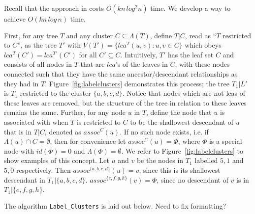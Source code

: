 \documentclass{article}
\newcommand{\leafset}{\Lambda}
\begin{document}
    Recall that the approach in \cite{gawrychowski2017faster} costs $O(kn\,log^2n)$ time. We develop a way to achieve $O(kn\,log\,n)$ time.

    First, for any tree $T$ and any cluster $C \subseteq \leafset(T)$, define $T|C$, read as ``$T$ restricted to $C$'', as the tree $T'$ with $V(T') = \{lca^T(u, v) : u, v \in C\}$ which obeys $lca^T(C') = lca^{T'}(C')$ for all $C' \subseteq C$. Intuitively, $T'$ has the leaf set $C$ and consists of all nodes in $T$ that are $lca$'s of the leaves in $C$, with these nodes connected such that they have the same ancestor/descendant relationships as they had in $T$. Figure~\ref{fig:labelclusters} demonstrates this process; the tree $T_1|L'$ is $T_1$ restricted to the cluster $\{a, b, c, d\}$. Notice that nodes which are not lcas of these leaves are removed, but the structure of the tree in relation to these leaves remains the same. Further, for any node $u$ in $T$, define the node that $u$ is associated with when $T$ is restricted to $C$ to be the shallowest descendant of $u$ that is in $T|C$, denoted as $assoc^{C}(u)$. If no such node exists, i.e. if $\leafset(u) \cap C = \emptyset$, then for convenience let $assoc^{C}(u) = \Phi$, where $\Phi$ is a special node with $id(\Phi) = 0$ and $\leafset(\Phi) = \emptyset$. We refer to Figure~\ref{fig:labelclusters} to show examples of this concept. Let $u$ and $v$ be the nodes in $T_1$ labelled $5, 1$ and $5, 0$ respectively. Then $assoc^{\{a, b, c, d\}}(u) = v$, since this is its shallowest descendant in $T_1|\{a, b, c, d\}$. $assoc^{\{e, f, g, h\}}(v) = \Phi$, since no descendant of $v$ is in $T_1|\{e, f, g, h\}$.

    The algorithm \texttt{Label\_Clusters} is laid out below. {\color{red} Need to fix formatting?}
\end{document}

